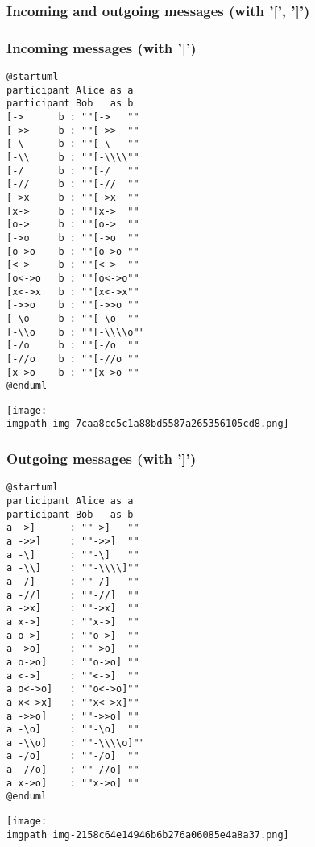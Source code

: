 \subsubsection{Incoming and outgoing messages (with '[', ']')}
\subsubsection{Incoming messages (with '[')}
\begin{verbatim}
@startuml
participant Alice as a
participant Bob   as b
[->      b : ""[->   ""
[->>     b : ""[->>  ""
[-\      b : ""[-\   ""
[-\\     b : ""[-\\\\""
[-/      b : ""[-/   ""
[-//     b : ""[-//  ""
[->x     b : ""[->x  ""
[x->     b : ""[x->  ""
[o->     b : ""[o->  ""
[->o     b : ""[->o  ""
[o->o    b : ""[o->o ""
[<->     b : ""[<->  ""
[o<->o   b : ""[o<->o""
[x<->x   b : ""[x<->x""
[->>o    b : ""[->>o ""
[-\o     b : ""[-\o  ""
[-\\o    b : ""[-\\\\o""
[-/o     b : ""[-/o  ""
[-//o    b : ""[-//o ""
[x->o    b : ""[x->o ""
@enduml
\end{verbatim}
\begin{center}
\texttt{[image: \\imgpath img-7caa8cc5c1a88bd5587a265356105cd8.png]}
\end{center}


\subsubsection{Outgoing messages (with ']')}
\begin{verbatim}
@startuml
participant Alice as a
participant Bob   as b
a ->]      : ""->]   ""
a ->>]     : ""->>]  ""
a -\]      : ""-\]   ""
a -\\]     : ""-\\\\]""
a -/]      : ""-/]   ""
a -//]     : ""-//]  ""
a ->x]     : ""->x]  ""
a x->]     : ""x->]  ""
a o->]     : ""o->]  ""
a ->o]     : ""->o]  ""
a o->o]    : ""o->o] ""
a <->]     : ""<->]  ""
a o<->o]   : ""o<->o]""
a x<->x]   : ""x<->x]""
a ->>o]    : ""->>o] ""
a -\o]     : ""-\o]  ""
a -\\o]    : ""-\\\\o]""
a -/o]     : ""-/o]  ""
a -//o]    : ""-//o] ""
a x->o]    : ""x->o] ""
@enduml
\end{verbatim}
\begin{center}
\texttt{[image: \\imgpath img-2158c64e14946b6b276a06085e4a8a37.png]}
\end{center}


